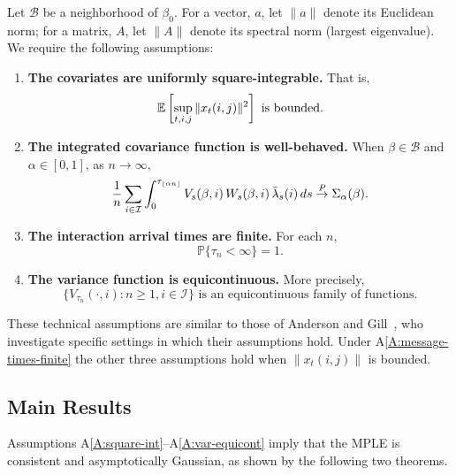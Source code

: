 \documentclass[aoas,preprint]{imsart}
\begin{document}
Let $\mathcal{B}$ be a neighborhood of $\beta_0$.  For a vector, $a$, let
$\| a \|$ denote its Euclidean norm; for a matrix, $A$, let $\| A \|$ denote
its spectral norm (largest eigenvalue).  We require the following assumptions:
\begin{enumerate}[{A}1.]
    \item \label{A:square-int}
    \textbf{The covariates are uniformly square-integrable.}  That is,
    \[
        \mathbb{E}\left[
            \sup_{t, i, j} \| x_{t}(i,j) \|^2
        \right]
        \,\,\text{is bounded.}
    \]

    \item \label{A:integrated-cov-limit}
    \textbf{The integrated covariance function is well-behaved.}
    When $\beta \in \mathcal{B}$ and $\alpha \in [0,1]$, as $ n \to \infty$,
    \[
        \frac{1}{n}
        \sum_{i \in \mathcal{I}}
        \int_0^{\tau_{\lfloor \alpha n \rfloor}}
            V_s(\beta,i)
            \, W_s(\beta,i)
            \, \bar \lambda_s(i)
            \, ds
        \overset{\mathit{P}}{\to}
        \Sigma_\alpha(\beta).
    \]

    \item \label{A:message-times-finite}
    \textbf{The interaction arrival times are finite.}  For each $n$,
    \[
        \mathbb{P}\{\tau_n < \infty\} = 1.
    \]

    \item \label{A:var-equicont}
    \textbf{The variance function is equicontinuous.}
    More precisely,
    \[
        \Big\{
            V_{\tau_n}(\cdot, i)
            :
            n \geq 1, i \in \mathcal{I}
        \Big\}
        \,\,\text{is an equicontinuous family of functions.}
    \]
\end{enumerate}

These technical assumptions are similar to those of Anderson and 
Gill~\cite{andersen1982cox}, who investigate specific settings in which their 
assumptions hold.  Under A\ref{A:message-times-finite} the other three 
assumptions hold when $\| x_t(i,j) \|$ is bounded.

\subsection{Main Results}
Assumptions A\ref{A:square-int}--A\ref{A:var-equicont} imply that the MPLE is consistent and asymptotically
Gaussian, as shown by the following two theorems.  
\end{document}

